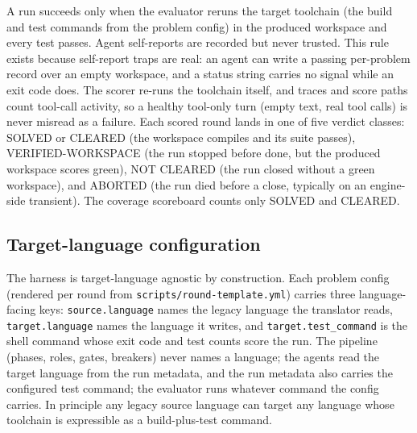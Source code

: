 \documentclass[11pt]{article}
\begin{document}
A run succeeds only when the evaluator reruns the target toolchain (the
build and test commands from the problem config) in the produced
workspace and every test passes. Agent self-reports are recorded but
never trusted. This rule exists because self-report traps are real:
an agent can write a passing per-problem record over an empty
workspace, and a status string carries no signal while an exit code
does. The scorer re-runs the
toolchain itself, and traces and score paths count tool-call activity, so
a healthy tool-only turn (empty text, real tool calls) is never misread
as a failure. Each scored round lands in one of five verdict classes:
\textsf{SOLVED} or \textsf{CLEARED} (the workspace compiles and its
suite passes), \textsf{VERIFIED-WORKSPACE} (the run stopped before
\textsf{done}, but the produced workspace scores green), \textsf{NOT
CLEARED} (the run closed without a green workspace), and
\textsf{ABORTED} (the run died before a close, typically on an
engine-side transient). The coverage scoreboard counts only
\textsf{SOLVED} and \textsf{CLEARED}.

\subsection{Target-language configuration}
\label{sec:targetlang}

The harness is target-language agnostic by construction. Each problem
config (rendered per round from \texttt{scripts/round-template.yml})
carries three language-facing keys: \texttt{source.language} names the
legacy language the translator reads, \texttt{target.language} names the
language it writes, and \texttt{target.test\_command} is the shell
command whose exit code and test counts score the run. The pipeline
(phases, roles, gates, breakers) never names a language; the agents read
the target language from the run metadata, and the run metadata also
carries the configured test command; the evaluator runs
whatever command the config carries. In principle any legacy source
language can target any language whose toolchain is expressible as a
build-plus-test command.
\end{document}
